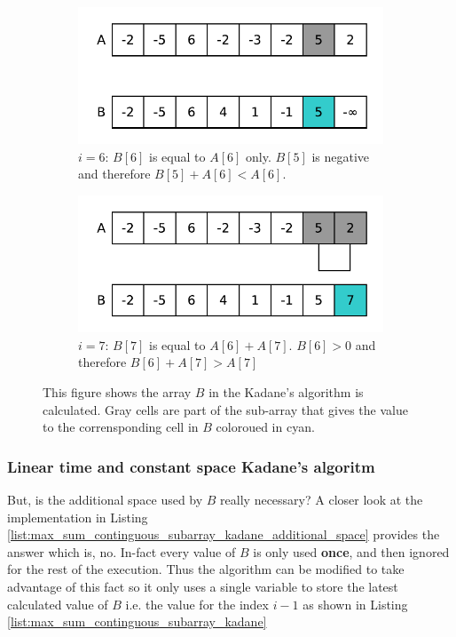 \begin{figure}
	\begin{subfigure}[t]{0.48\textwidth}
		\centering
		\includegraphics[width=\textwidth]{sources/max_sum_continguous_subarray/images/kadane7}
		\caption{ $i=6$: $B[6]$ is equal to $A[6]$ only. $B[5]$ is negative and therefore $B[5]+A[6] < A[6]$.}
		\label{fig:median_sorted_array:kadane6}
	\end{subfigure}
	\hfill
	\begin{subfigure}[t]{0.48\textwidth}
		\centering
		\includegraphics[width=\textwidth]{sources/max_sum_continguous_subarray/images/kadane8}
		\caption{$i=7$: $B[7]$ is equal to $A[6]+A[7]$. $B[6] > 0$ and therefore $B[6]+A[7] > A[7]$ }
		\label{fig:median_sorted_array:kadane7}
	\end{subfigure}
	\caption[Kadane's algorithm.]{This figure shows the array $B$ in the Kadane's algorithm is calculated. Gray cells are part of the sub-array that gives the value to the corrensponding cell in $B$ coloroued in cyan. }
	\label{fig:median_sorted_array:kadane}
\end{figure}


\subsubsection{Linear time and constant space Kadane's algoritm}
But, is the additional space used by $B$ really necessary? A closer look at the implementation in
Listing \ref{list:max_sum_continguous_subarray_kadane_additional_space} provides the answer which
is, no. In-fact every value of $B$ is only used \textbf{once}, and then ignored for the rest of the execution.
Thus the algorithm can be modified to take advantage of this fact so it only uses a single variable to store the latest calculated
value of $B$ i.e. the value for the index $i-1$ as shown in Listing
\ref{list:max_sum_continguous_subarray_kadane}

